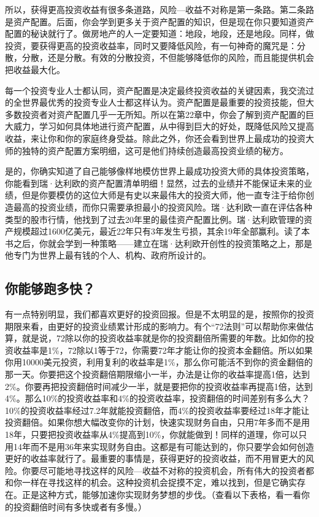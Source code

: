 所以，获得更高投资收益有很多条道路，风险—收益不对称是第一条路。第二条路是资产配置。后面，你会学到更多关于资产配置的知识，但是现在你只要知道资产配置的秘诀就行了。做房地产的人一定要知道：地段，地段，还是地段。同样，做投资，要获得更高的投资收益率，同时又要降低风险，有一句神奇的魔咒是：分散，分散，还是分散。有效的分散投资，不但能够降低你的风险，而且能提供机会把收益最大化。

每一个投资专业人士都认同，资产配置是决定最终投资收益的关键因素，我交流过的全世界最优秀的投资专业人士都这样认为。资产配置是最重要的投资技能，但大多数投资者对资产配置几乎一无所知。所以在第22章中，你会了解到资产配置的巨大威力，学习如何具体地进行资产配置，从中得到巨大的好处，既降低风险又提高收益，来让你和你的家庭终身受益。除此之外，你还会看到世界上最成功的投资大师的独特的资产配置方案明细，这可是他们持续创造最高投资业绩的秘方。

是的，你确实知道了自己能够像样地模仿世界上最成功投资大师的具体投资策略，你能看到瑞·达利欧的资产配置清单明细！显然，过去的业绩并不能保证未来的业绩，但是你要模仿的这位大师是有史以来最伟大的投资大师，他一直专注于给你创造最高的投资业绩，而你只需要承担最小的投资风险。瑞·达利欧一直在评估各种类型的股市行情，他找到了过去20年里的最佳资产配置比例。瑞·达利欧管理的资产规模超过1600亿美元，最近22年只有3年发生亏损，其余19年全部赢利。读了本书之后，你就会学到一种策略——建立在瑞·达利欧开创性的投资策略之上，那是他专门为世界上最有钱的个人、机构、政府所设计的。

\subsection{你能够跑多快？}

有一点特别明显，我们都喜欢更好的投资回报。但是不太明显的是，按照你的投资期限来看，由更好的投资业绩累计形成的影响力。有个“72法则”可以帮助你来做估算，就是说，72除以你的投资收益率就是你的投资翻倍所需要的年数。比如你的投资收益率是1\%，72除以1等于72，你需要72年才能让你的投资本金翻倍。所以如果你用10000美元投资，利用复利的收益率是1\%，那么你可能活不到你的资金翻倍的那一天。你要把这个投资翻倍期限缩小一半，办法是让你的收益率提高1倍，达到2\%。你要再把投资翻倍时间减少一半，就是要把你的投资收益率再提高1倍，达到4\%。那么10\%的投资收益率和4\%的投资收益率，投资翻倍的时间差别有多么大？10\%的投资收益率经过7.2年就能投资翻倍，而4\%的投资收益率要经过18年才能让投资翻倍。如果你想大幅改变你的计划，快速实现财务自由，只用7年多而不是用18年，只要把投资收益率从4\%提高到10\%，你就能做到！同样的道理，你可以只用14年而不是用36年来实现财务自由。这都是有可能达到的，你只要学会如何创造更好的收益率就行了。最重要的事情是，获得更好的投资收益，而不用冒更大的风险。你要尽可能地寻找这样的风险—收益不对称的投资机会，所有伟大的投资者都和你一样在寻找这样的机会。这种投资机会捉摸不定，难以找到，但是它确实存在。正是这种方式，能够加速你实现财务梦想的步伐。（查看以下表格，看一看你的投资翻倍时间有多快或者有多慢。）

